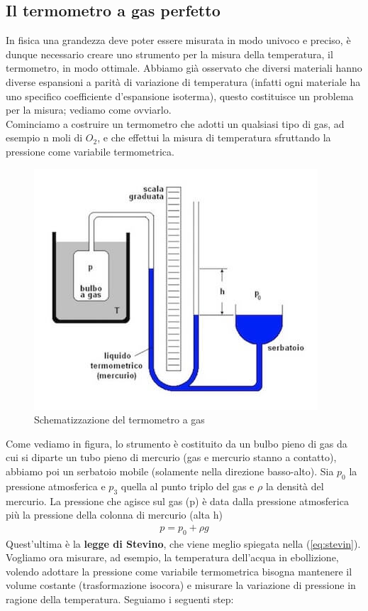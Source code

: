 \documentclass[
10pt, %
a4paper, %
oneside, %
headinclude,footinclude, %
BCOR5mm, %
]{scrartcl}
\begin{document}
\subsection{Il termometro a gas perfetto}\label{sec:termometroagasperfetto}
In fisica una grandezza deve poter essere misurata in modo univoco e preciso, è dunque necessario creare uno strumento per la misura della temperatura, il termometro, in modo ottimale. Abbiamo già osservato che diversi materiali hanno diverse espansioni a parità di variazione di temperatura (infatti ogni materiale ha uno specifico coefficiente d'espansione isoterma), questo costituisce un problema per la misura; vediamo come ovviarlo.\\
Cominciamo a costruire un termometro che adotti un qualsiasi tipo di gas, ad esempio n moli di $O_2$, e che effettui la misura di temperatura sfruttando la pressione come variabile termometrica.
\begin{figure}[h!]
	\centering
	\includegraphics[width=0.6\linewidth]{../images/termometro-a-gas}
	\caption{Schematizzazione del termometro a gas}
	\label{fig:termometro-a-gas}
\end{figure}
\FloatBarrier
Come vediamo in figura, lo strumento è costituito da un bulbo pieno di gas da cui si diparte un tubo pieno di mercurio (gas e mercurio stanno a contatto), abbiamo poi un serbatoio mobile (solamente nella direzione basso-alto). Sia $p_0$ la pressione atmosferica e $p_3$ quella al punto triplo del gas e $\rho$ la densità del mercurio. La pressione che agisce sul gas (p) è data dalla pressione atmosferica più la pressione della colonna di mercurio (alta h)
\begin{align*} 
	p = p_0 + \rho g
\end{align*} 
Quest'ultima è la \textbf{legge di Stevino}, che viene meglio spiegata nella (\ref{eq:stevin}).\\
Vogliamo ora misurare, ad esempio, la temperatura dell'acqua in ebollizione, volendo adottare la pressione come variabile termometrica bisogna mantenere il volume costante (trasformazione isocora) e misurare la variazione di pressione in ragione della temperatura. Seguiamo i seguenti step:
\end{document}

